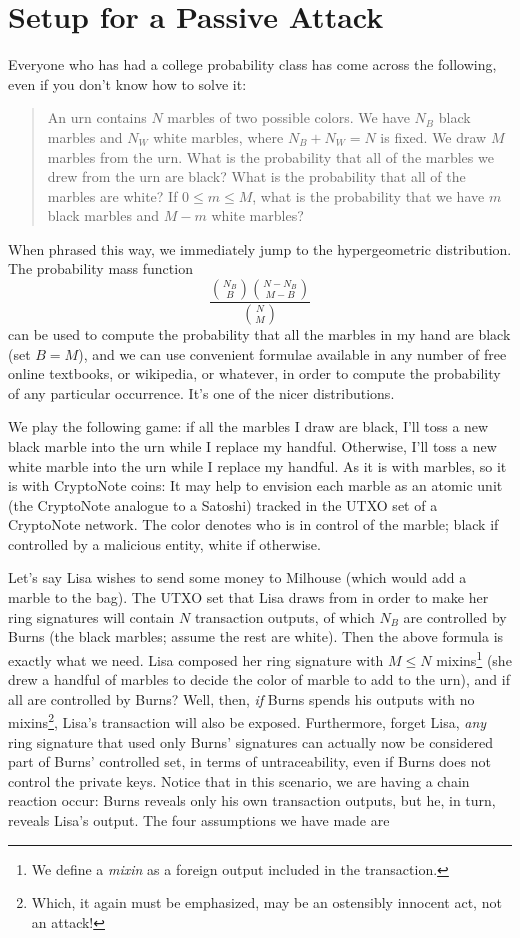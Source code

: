 \documentclass{mrl}
\begin{document}
\section{Setup for a Passive Attack}
Everyone who has had a college probability class has come across the following, even if you don't know how to solve it:

\begin{quote}
An urn contains $N$ marbles of two possible colors. We have $N_B$ black marbles and $N_W$ white marbles, where $N_B + N_W = N$ is fixed. We draw $M$ marbles from the urn. What is the probability that all of the marbles we drew from the urn are black? What is the probability that all of the marbles are white? If $0 \leq m \leq M$, what is the probability that we have $m$ black marbles and $M-m$ white marbles?
\end{quote}

When phrased this way, we immediately jump to the hypergeometric distribution. The probability mass function \[\frac{\binom{N_B}{B}\binom{N - N_B}{M - B}}{\binom{N}{M}}\] can be used to compute the probability that all the marbles in my hand are black (set $B=M$), and we can use convenient formulae available in any number of free online textbooks, or wikipedia, or whatever, in order to compute the probability of any particular occurrence. It's one of the nicer distributions.

We play the following game: if all the marbles I draw are black, I'll toss a new black marble into the urn while I replace my handful. Otherwise, I'll toss a new white marble into the urn while I replace my handful. As it is with marbles, so it is with CryptoNote coins: It may help to envision each marble as an atomic unit (the CryptoNote analogue to a Satoshi) tracked in the UTXO set of a CryptoNote network. The color denotes who is in control of the marble; black if controlled by a malicious entity, white if otherwise. 

Let's say Lisa wishes to send some money to Milhouse (which would add a marble to the bag). The UTXO set that Lisa draws from in order to make her ring signatures will contain $N$ transaction outputs, of which $N_B$ are controlled by Burns (the black marbles; assume the rest are white). Then the above formula is exactly what we need. Lisa composed her ring signature with $M \leq N$ mixins\footnote{We define a {\it mixin} as a foreign output included in the transaction.} (she drew a handful of marbles to decide the color of marble to add to the urn), and if all are controlled by Burns? Well, then, \emph{if} Burns spends his outputs with no mixins\footnote{Which, it again must be emphasized, may be an ostensibly innocent act, not an attack!}, Lisa's transaction will also be exposed. Furthermore, forget Lisa, \emph{any} ring signature that used only Burns' signatures can actually now be considered part of Burns' controlled set, in terms of untraceability, even if Burns does not control the private keys. Notice that in this scenario, we are having a chain reaction occur: Burns reveals only his own transaction outputs, but he, in turn, reveals Lisa's output.  The four assumptions we have made are
\end{document}
